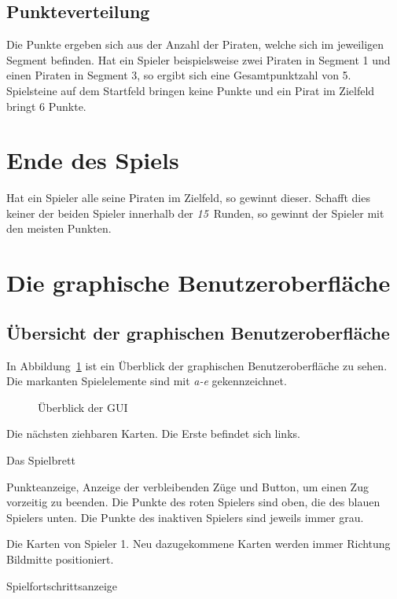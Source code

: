 \documentclass[a4paper, ngerman]{scrartcl}
\newcommand{\RundenAnzahl}{\emph{15}}
\begin{document}
	\subsection{Punkteverteilung}
	Die Punkte ergeben sich aus der Anzahl der Piraten, welche sich im jeweiligen
	Segment befinden. Hat ein Spieler beispielsweise zwei Piraten in Segment 1 und
	einen Piraten in Segment 3, so ergibt sich eine Gesamtpunktzahl von 5.\\
	Spielsteine auf dem Startfeld bringen keine Punkte und ein Pirat im Zielfeld
	bringt 6 Punkte.
	
\section{Ende des Spiels}

	Hat ein Spieler alle seine Piraten im Zielfeld, so gewinnt dieser. Schafft dies
	keiner der beiden Spieler innerhalb der \RundenAnzahl\ Runden, so
	gewinnt der Spieler mit den meisten Punkten.
	
\section{Die graphische Benutzeroberfläche}
\subsection{Übersicht der graphischen Benutzeroberfläche}
	In Abbildung~\ref{fig:GUI} ist ein Überblick der graphischen Benutzeroberfläche
	zu sehen. Die markanten Spielelemente sind mit \emph{a-e} gekennzeichnet.
	
	 \begin{figure}[h!]
		\centering		
		\caption{Überblick der GUI}
		\label{fig:GUI}
	\end{figure}
	
\begin{compactenum}[a)] \item Die nächsten ziehbaren Karten. Die Erste befindet
sich links.
\item Das Spielbrett \item Punkteanzeige, Anzeige der verbleibenden Züge und
Button, um einen Zug vorzeitig zu beenden. Die Punkte des roten Spielers sind
oben, die des blauen Spielers unten. Die Punkte des inaktiven Spielers sind
jeweils immer grau.
\item Die Karten von Spieler 1. Neu dazugekommene Karten werden immer Richtung
Bildmitte positioniert.
\item Spielfortschrittsanzeige
	\end{compactenum}
	
\end{document}
